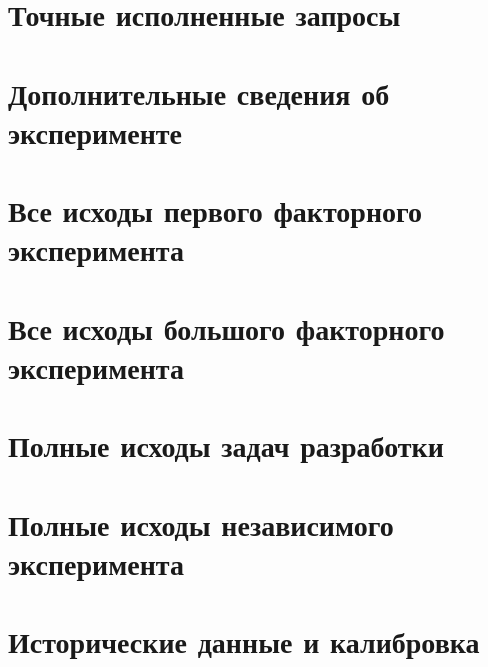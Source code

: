 \section{Точные исполненные запросы}


\clearpage\section{Дополнительные сведения об эксперименте}\label{app:experimental-details}

\clearpage\section{Все исходы первого факторного эксперимента}

\clearpage\section{Все исходы большого факторного эксперимента}

\clearpage\section{Полные исходы задач разработки}

\clearpage\section{Полные исходы независимого эксперимента}

\clearpage\section{Исторические данные и калибровка}


